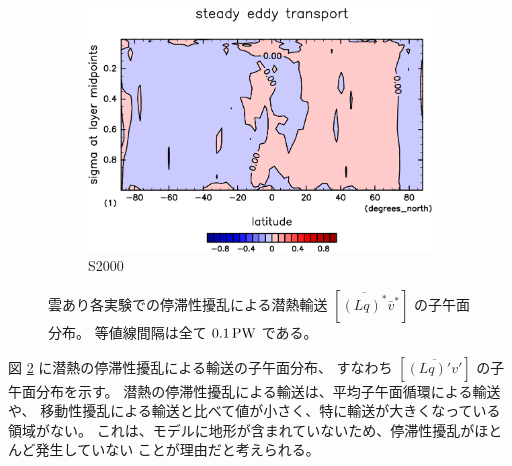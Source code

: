 \documentclass[body]{subfiles}
\begin{document}
\begin{figure}[t]
\begin{subfigure}{.4\textwidth}
		\includegraphics[width=\textwidth]{S2000/MeriHeatTransTest@latentEn_SE,time=7300:7665-crop-rotate.pdf}
		\caption{S2000}\label{潜熱停滞性擾乱S2000}
	\end{subfigure}
	\caption[雲あり各実験でのに停滞性擾乱による潜熱輸送の子午面分布]{
		雲あり各実験での停滞性擾乱による潜熱輸送 \([\overline{(Lq)^*}\bar v^*]\) の子午面分布。
		等値線間隔は全て \(0.1\hmu{PW}\) である。
	}\label{潜熱停滞性擾乱}
\end{figure}

図 \ref{潜熱停滞性擾乱} に潜熱の停滞性擾乱による輸送の子午面分布、
すなわち \([\overline{(Lq)'v'}]\) の子午面分布を示す。
潜熱の停滞性擾乱による輸送は、平均子午面循環による輸送や、
移動性擾乱による輸送と比べて値が小さく、特に輸送が大きくなっている領域がない。
これは、モデルに地形が含まれていないため、停滞性擾乱がほとんど発生していない
ことが理由だと考えられる。

\afterpage{\clearpage}
\end{document}
